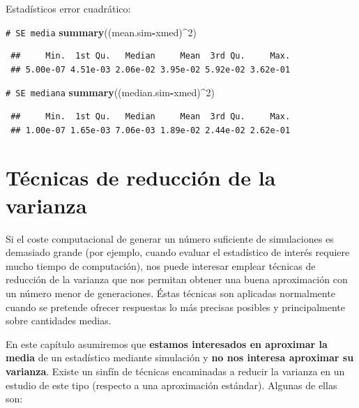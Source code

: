 \documentclass[
  spanish,
  10pt,
]{book}
\newenvironment{Shaded}{\begin{snugshade}}{\end{snugshade}}
\newcommand{\CommentTok}[1]{\textcolor[rgb]{0.56,0.35,0.01}{\textit{#1}}}
\newcommand{\DecValTok}[1]{\textcolor[rgb]{0.00,0.00,0.81}{#1}}
\newcommand{\FunctionTok}[1]{\textcolor[rgb]{0.13,0.29,0.53}{\textbf{#1}}}
\newcommand{\NormalTok}[1]{#1}
\newcommand{\SpecialCharTok}[1]{\textcolor[rgb]{0.81,0.36,0.00}{\textbf{#1}}}
\theoremstyle{break}
\theoremstyle{nonumberplain}
\renewcommand{\CommentTok}[1]{\textcolor[rgb]{0.41,0.41,0.41}{\texttt{#1}}}
\begin{document}
\begin{enumerate}
  Estadísticos error cuadrático:

\begin{Shaded}
\begin{Highlighting}[]
\CommentTok{\# SE media}
\FunctionTok{summary}\NormalTok{((mean.sim}\SpecialCharTok{{-}}\NormalTok{xmed)}\SpecialCharTok{\^{}}\DecValTok{2}\NormalTok{) }
\end{Highlighting}
\end{Shaded}

\begin{verbatim}
 ##     Min.  1st Qu.   Median     Mean  3rd Qu.     Max. 
 ## 5.00e-07 4.51e-03 2.06e-02 3.95e-02 5.92e-02 3.62e-01
\end{verbatim}

\begin{Shaded}
\begin{Highlighting}[]
\CommentTok{\# SE mediana}
\FunctionTok{summary}\NormalTok{((median.sim}\SpecialCharTok{{-}}\NormalTok{xmed)}\SpecialCharTok{\^{}}\DecValTok{2}\NormalTok{) }
\end{Highlighting}
\end{Shaded}

\begin{verbatim}
 ##     Min.  1st Qu.   Median     Mean  3rd Qu.     Max. 
 ## 1.00e-07 1.65e-03 7.06e-03 1.89e-02 2.44e-02 2.62e-01
\end{verbatim}
\end{enumerate}

\chapter{Técnicas de reducción de la varianza}\label{red-varianza}

Si el coste computacional de generar un número suficiente de simulaciones es demasiado grande (por ejemplo, cuando evaluar el estadístico de interés requiere mucho tiempo de computación), nos puede interesar emplear técnicas de reducción de la varianza que nos permitan obtener una buena aproximación con un número menor de generaciones. Éstas técnicas son aplicadas normalmente cuando se pretende ofrecer respuestas lo más precisas posibles y principalmente sobre cantidades medias.

En este capítulo asumiremos que \textbf{estamos interesados en aproximar la media} de un estadístico mediante simulación y \textbf{no nos interesa aproximar su varianza}.
Existe un sinfín de técnicas encaminadas a reducir la varianza en un estudio de este tipo (respecto a una aproximación estándar).
Algunas de ellas son:
\end{document}
